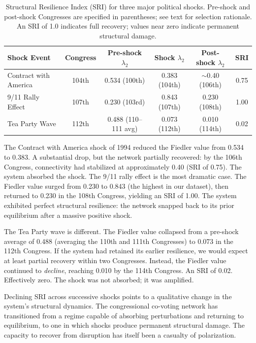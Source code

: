 \documentclass[12pt, a4paper]{article}
\begin{document}
\begin{table}[!htbp]
\centering
\caption{Structural Resilience Index (SRI) for three major political shocks. Pre-shock and post-shock Congresses are specified in parentheses; see text for selection rationale. An SRI of 1.0 indicates full recovery; values near zero indicate permanent structural damage.}
\label{tab:resilience}
\begin{tabular}{lccccc}
\toprule
Shock Event & Congress & Pre-shock $\lambda_2$ & Shock $\lambda_2$ & Post-shock $\lambda_2$ & SRI \\
\midrule
Contract with America & 104th & 0.534 (100th) & 0.383 (104th) & $\sim$0.40 (106th) & 0.75 \\
9/11 Rally Effect & 107th & 0.230 (103rd) & 0.843 (107th) & 0.230 (108th) & 1.00 \\
Tea Party Wave & 112th & 0.488 (110--111 avg) & 0.073 (112th) & 0.010 (114th) & 0.02 \\
\bottomrule
\end{tabular}
\end{table}

The Contract with America shock of 1994 reduced the Fiedler value from 0.534 to 0.383. A substantial drop, but the network partially recovered: by the 106th Congress, connectivity had stabilized at approximately 0.40 (SRI of 0.75). The system absorbed the shock. The 9/11 rally effect is the most dramatic case. The Fiedler value surged from 0.230 to 0.843 (the highest in our dataset), then returned to 0.230 in the 108th Congress, yielding an SRI of 1.00. The system exhibited perfect structural resilience: the network snapped back to its prior equilibrium after a massive positive shock.

The Tea Party wave is different. The Fiedler value collapsed from a pre-shock average of 0.488 (averaging the 110th and 111th Congresses) to 0.073 in the 112th Congress. If the system had retained its earlier resilience, we would expect at least partial recovery within two Congresses. Instead, the Fiedler value continued to \textit{decline}, reaching 0.010 by the 114th Congress. An SRI of 0.02. Effectively zero. The shock was not absorbed; it was amplified.

Declining SRI across successive shocks points to a qualitative change in the system's structural dynamics. The congressional co-voting network has transitioned from a regime capable of absorbing perturbations and returning to equilibrium, to one in which shocks produce permanent structural damage. The capacity to recover from disruption has itself been a casualty of polarization.
\end{document}
